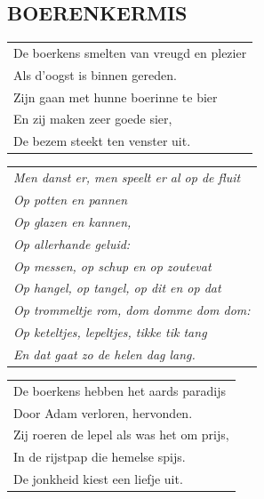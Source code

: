 \documentclass{article}
\begin{document}
\subsection*{BOERENKERMIS}
\begin{flushleft}
\begin{tabularx}{0.8\textwidth} {
   >{\raggedright\arraybackslash}X}
   De boerkens smelten van vreugd en plezier\\
Als d’oogst is binnen gereden.\\
Zijn gaan met hunne boerinne te bier\\
En zij maken zeer goede sier,\\
De bezem steekt ten venster uit.\\
\end{tabularx}
\end{flushleft}\begin{flushleft}
\begin{tabularx}{0.8\textwidth} {
   >{\raggedright\arraybackslash}X}
\textit{Men danst er, men speelt er al op de fluit}\\
\textit{Op potten en pannen}\\
\textit{Op glazen en kannen,}\\
\textit{Op allerhande geluid:}\\
\textit{Op messen, op schup en op zoutevat}\\
\textit{Op hangel, op tangel, op dit en op dat}\\
\textit{Op trommeltje rom, dom domme dom dom:}\\
\textit{Op keteltjes, lepeltjes, tikke tik tang}\\
\textit{En dat gaat zo de helen dag lang.}\\
\end{tabularx}
\end{flushleft}\begin{flushleft}
\begin{tabularx}{0.8\textwidth} {
   >{\raggedright\arraybackslash}X}
De boerkens hebben het aards paradijs\\
Door Adam verloren, hervonden.\\
Zij roeren de lepel als was het om prijs,\\
In de rijstpap die hemelse spijs.\\
De jonkheid kiest een liefje uit.\\
\end{tabularx}
\end{flushleft}
\end{document}
